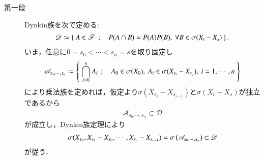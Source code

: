 \begin{prf}[Problem 1.4]\mbox{}
	\begin{description}
		\item[第一段]
			Dynkin族を次で定める:
			\begin{align}
				\mathscr{D} \coloneqq
				\left\{\ A \in \mathscr{F}\ \, ; \quad P(A \cap B) = P(A)P(B),\ \forall B \in \sigma(X_t - X_s)\ \right\}.
			\end{align}
			いま，任意に$0 = s_0 < \cdots < s_n = s$を取り固定し
			\begin{align}
				\mathscr{A}_{s_0, \cdots, s_n} \coloneqq
				\left\{\ \bigcap_{i=0}^n A_i\ \, ; \quad A_0 \in \sigma(X_0),\ A_i \in \sigma(X_{s_i} - X_{s_j}),\ i=1,\cdots,n\ \right\}
			\end{align}
			により乗法族を定めれば，仮定より$\sigma(X_{s_i} - X_{s_{i-1}})$と$\sigma(X_t - X_s)$が独立であるから
			\begin{align}
				\mathscr{A}_{s_0, \cdots, s_n}
				\subset \mathscr{D}
			\end{align}
			が成立し，Dynkin族定理により
			\begin{align}
				\sigma(X_{s_0},X_{s_1}-X_{s_0},\cdots,X_{s_n} - X_{s_{n-1}})
				= \sigma \left(\mathscr{A}_{s_0, \cdots, s_n}\right)
				\subset \mathscr{D}
				\label{eq:thm_application_dynkin_system_theorem_to_independence_2}
			\end{align}
			が従う．
		

\end{description}
\end{prf}

